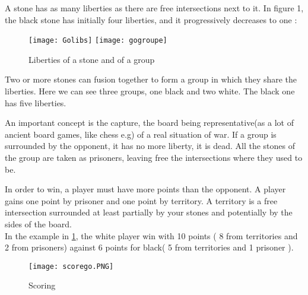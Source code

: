 A stone has as many liberties as there are free intersections next to it. In figure 1, the black stone has initially four liberties, and it progressively decreases to one : 

\begin{figure}
\begin{center}
\texttt{[image: Golibs]}
\texttt{[image: gogroupe]}
\caption{Liberties of a stone and of a group}
\end{center}

\end{figure}
Two or more stones can fusion together to form a group in which they share the liberties. Here we can see three groups, one black and two white. The black one has five liberties. 


An important concept is the capture, the board being representative(as a lot of ancient board games, like chess e.g) of a real situation of war. If a group is surrounded by the opponent, it has no more liberty, it is dead. All the stones of the group are taken as prisoners, leaving free the intersections where they used to be. 

In order to win, a player must have more points than the opponent. A player gains one point by prisoner and one point by territory. A territory is a free intersection surrounded at least partially by your stones and potentially by the sides of the board. 
\\

In the example in \ref{score}, the white player win with 10 points ( 8 from territories and 2 from prisoners) against 	6 points for black( 5 from territories and 1 prisoner ). 
\begin{figure}
\begin{center}
\texttt{[image: scorego.PNG]}
\end{center}
\caption{Scoring}
\label{score}
\end{figure}